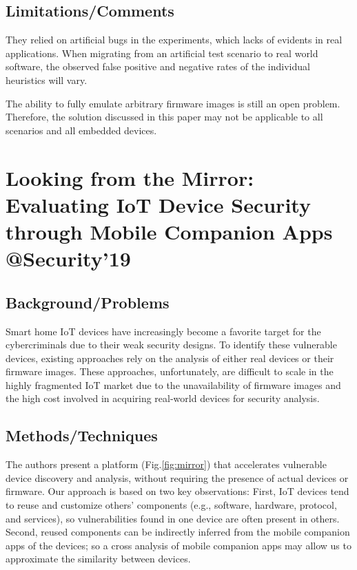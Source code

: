 \subsection{Limitations/Comments}
They relied on artificial bugs in the experiments, which lacks of evidents in real applications. When migrating from an artificial test scenario to real world software, the observed false positive and negative rates of the individual heuristics will vary.

The ability to fully emulate arbitrary firmware images is still an open problem. Therefore, the solution discussed in this paper may not be applicable to all scenarios and all embedded devices. 

\newpage

\section{Looking from the Mirror: Evaluating IoT Device Security through Mobile Companion Apps \\@Security'19}
\subsection{Background/Problems}
Smart home IoT devices have increasingly become a favorite target for the cybercriminals due to their weak security designs. To identify these vulnerable devices, existing approaches rely on the analysis of either real devices or their firmware images. These approaches, unfortunately, are difficult to scale in the highly fragmented IoT market due to the unavailability of firmware images and the high cost involved in acquiring real-world devices for security analysis.

\subsection{Methods/Techniques}
The authors present a platform (Fig.\ref{fig:mirror}) that accelerates vulnerable device discovery and analysis, without requiring the presence of actual devices or firmware. Our approach is based on two key observations: First, IoT devices tend to reuse and customize others’ components (e.g., software, hardware, protocol, and services), so vulnerabilities found in one device are often present in others. Second, reused components can be indirectly inferred from the mobile companion apps of the devices; so a cross analysis of mobile companion apps may allow us to approximate the similarity between devices.

